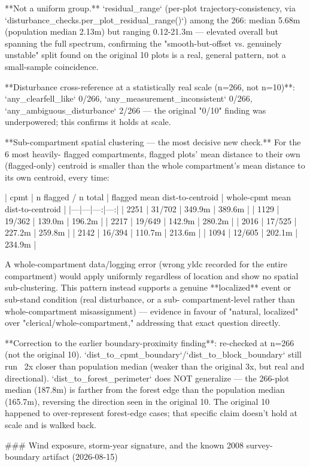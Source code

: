 **Not a uniform group.** `residual_range` (per-plot trajectory-consistency, via
`disturbance_checks.per_plot_residual_range()`) among the 266: median 5.68m (population median
2.13m) but ranging 0.12-21.3m — elevated overall but spanning the full spectrum, confirming the
"smooth-but-offset vs. genuinely unstable" split found on the original 10 plots is a real, general
pattern, not a small-sample coincidence.

**Disturbance cross-reference at a statistically real scale (n=266, not n=10)**: `any_clearfell_like`
0/266, `any_measurement_inconsistent` 0/266, `any_ambiguous_disturbance` 2/266 — the original
"0/10" finding was underpowered; this confirms it holds at scale.

**Sub-compartment spatial clustering — the most decisive new check.** For the 6 most heavily-
flagged compartments, flagged plots' mean distance to their own (flagged-only) centroid is smaller
than the whole compartment's mean distance to its own centroid, every time:

| cpmt | n flagged / n total | flagged mean dist-to-centroid | whole-cpmt mean dist-to-centroid |
|---|---|---:|---:|
| 2251 | 31/702 | 349.9m | 389.6m |
| 1129 | 19/362 | 139.0m | 196.2m |
| 2217 | 19/649 | 142.9m | 280.2m |
| 2016 | 17/525 | 227.2m | 259.8m |
| 2142 | 16/394 | 110.7m | 213.6m |
| 1094 | 12/605 | 202.1m | 234.9m |

A whole-compartment data/logging error (wrong yldc recorded for the entire compartment) would
apply uniformly regardless of location and show no spatial sub-clustering. This pattern instead
supports a genuine **localized** event or sub-stand condition (real disturbance, or a sub-
compartment-level rather than whole-compartment misassignment) — evidence in favour of "natural,
localized" over "clerical/whole-compartment," addressing that exact question directly.

**Correction to the earlier boundary-proximity finding**: re-checked at n=266 (not the original
10). `dist_to_cpmt_boundary`/`dist_to_block_boundary` still run ~2x closer than population median
(weaker than the original 3x, but real and directional). `dist_to_forest_perimeter` does NOT
generalize — the 266-plot median (187.8m) is farther from the forest edge than the population
median (165.7m), reversing the direction seen in the original 10. The original 10 happened to
over-represent forest-edge cases; that specific claim doesn't hold at scale and is walked back.

### Wind exposure, storm-year signature, and the known 2008 survey-boundary artifact (2026-08-15)

